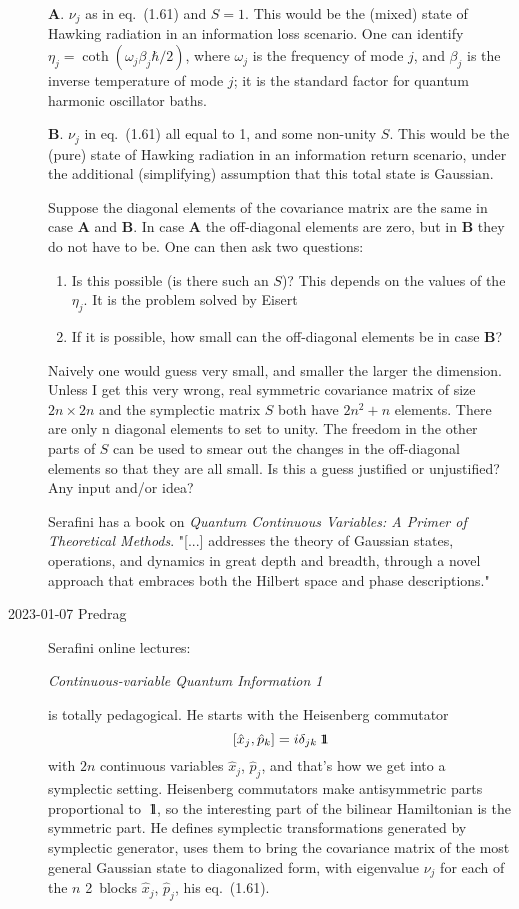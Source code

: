 \begin{description}
\medskip
\textbf{A}. $\nu_j$ as in eq.~(1.61) and $S=1$.
This would be the (mixed) state of Hawking radiation in an information loss scenario.
One can identify $\eta_j = \coth(\omega_j \beta_j \hbar /2)$,
where $\omega_j$ is the frequency of mode $j$, and $\beta_j$ is the inverse temperature of mode $j$;
it is the standard factor for quantum harmonic oscillator baths.

\medskip
\textbf{B}. $\nu_j$ in eq.~(1.61) all equal to 1, and some non-unity $S$.
This would be the (pure) state of Hawking radiation in an information return scenario,
under the additional (simplifying) assumption that this total state is Gaussian.

Suppose the diagonal elements of the covariance matrix are the same in case \textbf{A} and \textbf{B}.
In case \textbf{A} the off-diagonal elements are zero, but in \textbf{B} they do not have to be.
One can then ask two questions:
\begin{enumerate}
  \item Is this possible (is there such an $S$)?
This depends on the values of the $\eta_j$. It is the problem solved by Eisert\etal{}
  \item If it is possible, how small can the off-diagonal elements be in case \textbf{B}?
\end{enumerate}
Naively one would guess very small, and smaller the larger the dimension.
Unless I get this very wrong, real symmetric covariance matrix of size $2n\times2n$
and the symplectic matrix $S$ both have $2n^2+n$ elements. There are only n
diagonal elements to set to unity. The freedom in the other parts of $S$ can be
used to smear out the changes in the off-diagonal elements so that they are
all small. Is this a guess justified or unjustified? Any input and/or idea?

Serafini has a book on
{{\em  Quantum Continuous Variables: A Primer of Theoretical Methods}}.
"[...] addresses the theory of Gaussian states, operations, and dynamics in
great depth and breadth, through a novel approach that embraces both the
Hilbert space and phase descriptions."

\item[2023-01-07 Predrag] Serafini online lectures:

{\em Continuous-variable Quantum Information 1}

is totally pedagogical.
He starts with the Heisenberg commutator
\[
[\hat{x}_j,\hat{p}_k] = i\delta_{jk} {\ \hbox{{\rm 1}\kern-.62em\hbox{\rm 1}}}
\]
with $2n$  continuous variables $\hat{x}_j$, $\hat{p}_j$, and that's how we
get into a symplectic setting. Heisenberg commutators make antisymmetric
parts proportional to ${\ \hbox{{\rm 1}\kern-.62em\hbox{\rm 1}}}$, so the interesting part of the bilinear
Hamiltonian is the symmetric part. He defines symplectic transformations
generated by symplectic generator, uses them to bring the covariance matrix
of the most general Gaussian state to diagonalized form, with eigenvalue
$\nu_j$ for each of the $n$ 2\dmn\ blocks $\hat{x}_j$, $\hat{p}_j$, his
eq.~(1.61).


\end{description}
